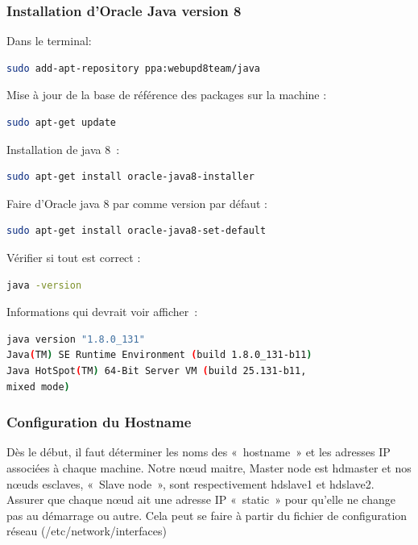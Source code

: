 \documentclass[12pt,french]{book}
\begin{document}
\subsubsection{Installation d’Oracle Java version 8}

Dans le terminal:

\begin{lstlisting}[language=bash, frame=single]
sudo add-apt-repository ppa:webupd8team/java
\end{lstlisting}

Mise à jour de la base de référence des packages sur la machine :

\begin{lstlisting}[language=bash, frame=single]
sudo apt-get update
\end{lstlisting}

Installation de java 8 :

\begin{lstlisting}[language=bash, frame=single]
sudo apt-get install oracle-java8-installer
\end{lstlisting}

Faire d’Oracle java 8 par comme version par défaut :

\begin{lstlisting}[language=bash, frame=single]
sudo apt-get install oracle-java8-set-default
\end{lstlisting}

Vérifier si tout est correct :

\begin{lstlisting}[language=bash, frame=single]
java -version
\end{lstlisting}

Informations qui devrait voir afficher :  
\begin{lstlisting}[language=bash, frame=single]
java version "1.8.0_131"
Java(TM) SE Runtime Environment (build 1.8.0_131-b11)
Java HotSpot(TM) 64-Bit Server VM (build 25.131-b11,
mixed mode)
\end{lstlisting}

\subsubsection{Configuration du Hostname}

Dès le début, il faut déterminer les noms des « hostname » et les adresses IP associées à chaque machine.  Notre nœud maitre, Master node est hdmaster et nos nœuds esclaves, « Slave node », sont respectivement hdslave1 et hdslave2. Assurer que chaque nœud ait une adresse IP « static » pour qu’elle ne change pas au démarrage ou autre. Cela peut se faire à partir du fichier de configuration réseau (/etc/network/interfaces)
\end{document}
